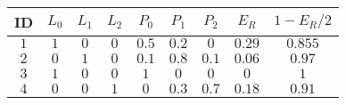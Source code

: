 \begin{table}[htp]
    \small
    \centering
    \begin{tabular}{c c c c c c c c c}
        ID  & \hspace{10pt}$L_{0}$  & \hspace{10pt}$L_{1}$  & \hspace{10pt}$L_{2}$  & \hspace{10pt}$P_{0}$ & \hspace{10pt}$P_{1}$ & \hspace{10pt}$P_{2}$  & \hspace{10pt}$E_{R}$ & \hspace{10pt}$1-E_{R}/2$ \\\hline
        $1$ & \hspace{10pt}$1$ & \hspace{10pt}$0$ & \hspace{10pt}$0$ & \hspace{10pt}$0.5$ & \hspace{10pt}$0.2$ & \hspace{10pt}$0$ & \hspace{10pt}$0.29$ & \hspace{10pt}$0.855$           \\\hline
        $2$ & \hspace{10pt}$0$      & \hspace{10pt}$1$ & \hspace{10pt}$0$   & \hspace{10pt}$0.1$    & \hspace{10pt}$0.8$ & \hspace{10pt}$0.1$ & \hspace{10pt}$0.06$ & \hspace{10pt}$0.97$     \\\hline
        $3$ & \hspace{10pt}$1$      & \hspace{10pt}$0$ & \hspace{10pt}$0$   & \hspace{10pt}$1$    & \hspace{10pt}$0$ & \hspace{10pt}$0$ & \hspace{10pt}$0$  & \hspace{10pt}$1$   \\\hline
        $4$ & \hspace{10pt}$0$      & \hspace{10pt}$0$  & \hspace{10pt}$1$  & \hspace{10pt}$0$    & \hspace{10pt}$0.3$ & \hspace{10pt}$0.7$ & \hspace{10pt}$0.18$  & \hspace{10pt}$0.91$    \\\hline

\end{tabular}
\end{table}
